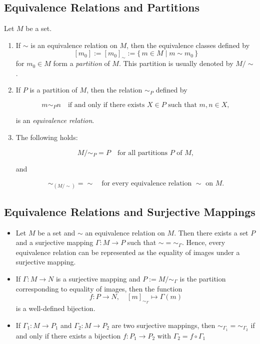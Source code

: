 \QED

\subsection{Equivalence Relations and Partitions}

Let \( M \) be a set.

\begin{enumerate}

	\item If \( \sim \) is an equivalence relation on \( M \), then the equivalence classes defined by  
    \[
        [m_0] := [m_0]_{\sim} := \{\, m \in M \mid m \sim m_0 \,\}
    \]
    for \( m_0 \in M \) form a \emph{partition} of \( M \).  
    This partition is usually denoted by \( M / \!\sim \).

    \item If \( P \) is a partition of \( M \), then the relation \( \sim_P \) defined by  

	\[
        m \sim_P n \quad \text{if and only if there exists } X \in P \text{ such that } m, n \in X,
    \]

	is an \emph{equivalence relation}.

    \item The following holds:

	\[
        M / \!\sim_P = P
        \quad \text{for all partitions } P \text{ of } M,
    \]

	and

	\[
        \sim_{(M / \!\sim)} = \sim
        \quad \text{for every equivalence relation } \sim \text{ on } M.
    \]

\end{enumerate}


\subsection{Equivalence Relations and Surjective Mappings}

\begin{itemize}

	\item Let \( M \) be a set and \( \sim \) an equivalence relation on \( M \).  
    Then there exists a set \( P \) and a surjective mapping  
    \( \Gamma : M \to P \) such that \( \sim = \sim_{\Gamma} \).  
    Hence, every equivalence relation can be represented as the equality of images under a surjective mapping.

    \item If \( \Gamma : M \to N \) is a surjective mapping and  
    \( P := M / \!\sim_{\Gamma} \) is the partition corresponding to equality of images,  
    then the function
    \[
        f : P \to N, \quad [m]_{\sim_{\Gamma}} \mapsto \Gamma(m)
    \]
    is a well-defined bijection.

    \item If \( \Gamma_1 : M \to P_1 \) and \( \Gamma_2 : M \to P_2 \) are two surjective mappings,  
    then \( \sim_{\Gamma_1} = \sim_{\Gamma_2} \) if and only if there exists a bijection \(f: P_1 \to P_2\) with 
	\(\Gamma_2  = f \circ \Gamma_1\)

\end{itemize}

